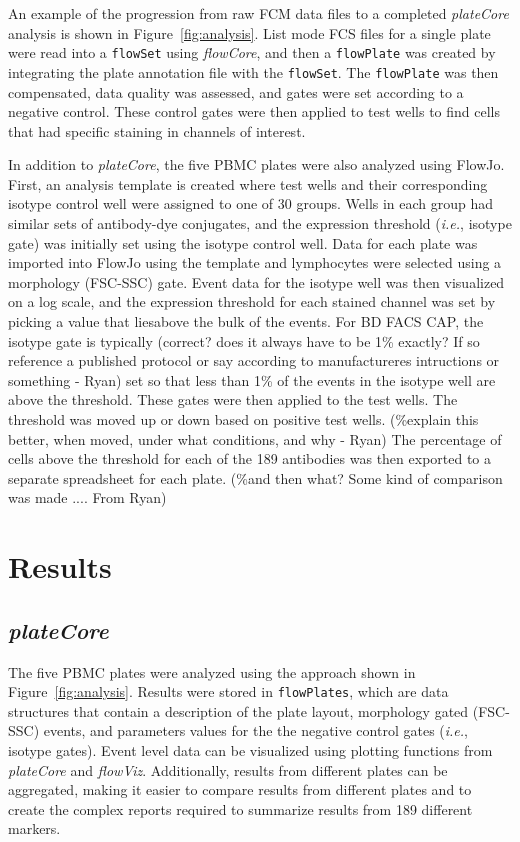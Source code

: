 \documentclass[12pt]{article}
\newcommand{\Robject}[1]{{\texttt{#1}}}
\newcommand{\Rpackage}[1]{{\textit{#1}}}
\begin{document}
An example of the progression from raw FCM data files to a completed
\Rpackage{plateCore} analysis is shown in Figure~\ref{fig:analysis}. List mode
FCS files for a single plate were read into a \Robject{flowSet} using
\Rpackage{flowCore}, and then a \Robject{flowPlate} was created by integrating
the plate annotation file with the \Robject{flowSet}. The \Robject{flowPlate}
was then compensated, data quality was assessed, and gates were set according
to a negative control. These control gates were then applied to test wells to
find cells that had specific staining in channels of interest.

In addition to \Rpackage{plateCore}, the five PBMC plates were also analyzed
using FlowJo. First, an analysis template is created where test wells and their
corresponding isotype control well were assigned to one of 30 groups. Wells in
each group had similar sets of antibody-dye conjugates, and the expression 
threshold (\emph{i.e.}, isotype gate) was initially set using the isotype
control well. Data for each plate was imported into FlowJo using the template
and lymphocytes were selected using a morphology (FSC-SSC) gate. Event data for
the isotype well was then visualized on a log scale, and the expression
threshold for each stained channel was set by picking a value that liesabove
the bulk of the events. For BD FACS CAP, the isotype gate is typically
(correct? does it always have to be 1\% exactly? If so reference a published
protocol or say according to manufactureres intructions or something - Ryan) set
so that less than 1\% of the events in the isotype well are above the
threshold. These gates were then applied to the test wells. The threshold was
moved up or down based on positive test wells. (\%explain this better, when
moved, under what conditions, and why - Ryan) The percentage of cells above the
threshold for each of the 189 antibodies was then exported to a separate
spreadsheet for each plate. (\%and then what? Some kind of comparison was made
.... From Ryan)

\section*{Results}

\subsection*{\Rpackage{plateCore}}
The five PBMC plates were analyzed using the approach shown in
Figure~\ref{fig:analysis}. Results were stored in \Robject{flowPlates}, which
are data structures that contain a description of the plate layout, morphology
gated (FSC-SSC) events, and parameters values for the the negative control
gates (\emph{i.e.}, isotype gates). Event level data can be visualized using
plotting functions from \Rpackage{plateCore} and \Rpackage{flowViz}.
Additionally, results from different plates can be aggregated, making it easier
to compare results from different plates and to create the complex reports
required to summarize results from 189 different markers.
\end{document}
